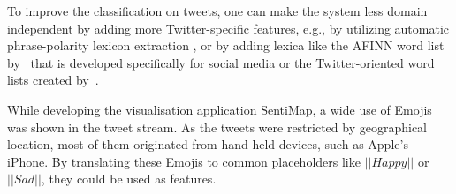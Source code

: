To improve the classification on tweets, one can make the system less domain independent by adding more Twitter-specific features, e.g., by utilizing automatic phrase-polarity lexicon extraction \citep{VelikovichEA:10}, or by adding lexica like the AFINN word list by~\cite{article:afinn} that is developed specifically for social media or the Twitter-oriented word lists created by~\cite{MohammadEA:13}.

While developing the visualisation application SentiMap, a wide use of Emojis was shown in the tweet stream. As the tweets were restricted by geographical location, most of them originated from hand held devices, such as Apple's iPhone. By translating these Emojis to common placeholders like $||Happy||$ or $||Sad||$, they could be used as features.